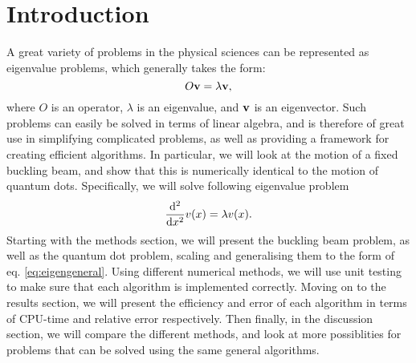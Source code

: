 \section{Introduction}
\label{sec:introduction}

A great variety of problems in the physical sciences can be represented as
eigenvalue problems, which generally takes the form:
  \begin{equation}
    \label{eq:eigengeneral}
    O\vb{v} = \lambda \vb{v},
  \end{equation}
where $O$ is an operator, $\lambda$ is an eigenvalue, and $\vb{v}$ is an eigenvector.
Such problems can easily be solved in terms of linear algebra, and is therefore
of great use in simplifying complicated problems, as well as providing a framework for creating efficient
algorithms.
In particular, we will look at the motion of a fixed buckling beam, and show that this is numerically
identical to the motion of quantum dots. Specifically, we will solve following
eigenvalue problem
  \begin{equation}
  \label{eq:eigenspecial}
    \dv[2]{}{x}v\qty(x) = \lambda v\qty(x).
  \end{equation}
Starting with the methods section, we will present the buckling beam problem, as well
as the quantum dot problem, scaling and generalising them to the form of eq. \ref{eq:eigengeneral}.
Using different numerical methods, we will use unit testing to make sure that each
algorithm is implemented correctly.
Moving on to the results section, we will present the efficiency and error of each
algorithm in terms of CPU-time and relative error respectively. Then finally,
in the discussion section, we will compare the different methods, and look at
more possiblities for problems that can be solved using the same general algorithms.
